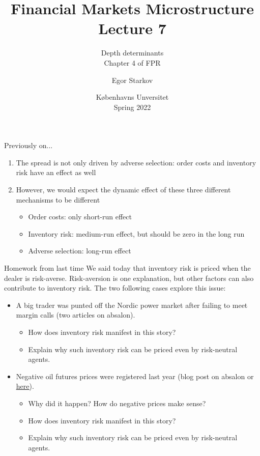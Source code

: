 \documentclass[english,10pt
,aspectratio=169
]{beamer}
\title{Financial Markets Microstructure \\ Lecture 7}
\subtitle{Depth determinants \\ %
	Chapter 4 of FPR}
\author{Egor Starkov}
\date{K{\o}benhavns Unversitet \\
	Spring 2022}
\begin{document}
	

\frame[plain]{\titlepage}


\begin{frame}{Previously on...}
	\begin{enumerate}
		\item The spread is not only driven by adverse selection: order costs and inventory risk have an effect as well
		\item However, we would expect the dynamic effect of these three different mechanisms to be different
		\begin{itemize}
			\item Order costs: only short-run effect 
			\item Inventory risk: medium-run effect, but should be zero in the long run
			\item Adverse selection: long-run effect 
		\end{itemize}
	\end{enumerate}
\end{frame}


\begin{frame}{Homework from last time}
	We said today that inventory risk is priced when the dealer is risk-averse. Risk-aversion is one explanation, but other factors can also contribute to inventory risk.
	The two following cases explore this issue:
	\begin{itemize}
		\item A big trader was punted off the Nordic power market after failing to meet margin calls (two articles on absalon).
		\begin{itemize}
			\item How does inventory risk manifest in this story?
			\item Explain why such inventory risk can be priced even by risk-neutral agents.
		\end{itemize}
		\item Negative oil futures prices were registered last year (blog post on absalon or \href{https://streetwiseprofessor.com/wti-wtf/}{\uline{here}}).
		\begin{itemize}
			\item Why did it happen? How do negative prices make sense?
			\item How does inventory risk manifest in this story?
			\item Explain why such inventory risk can be priced even by risk-neutral agents.
		\end{itemize}
	\end{itemize}
\end{frame}
\end{document}
